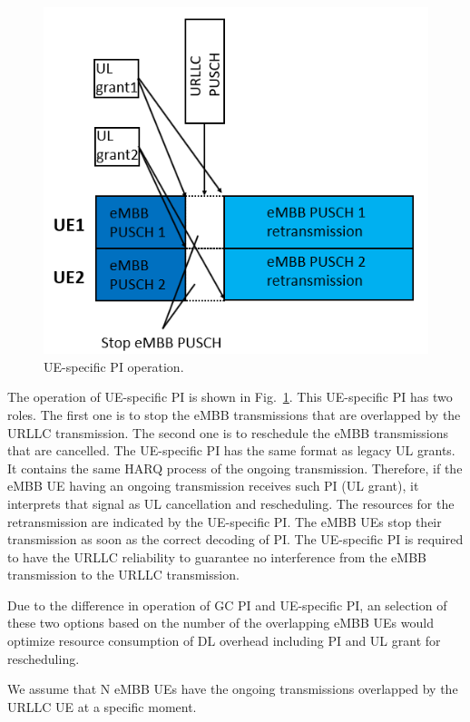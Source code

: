 \documentclass{ieeeaccess}
\begin{document}
\begin{figure}[htbp]
\centerline{\includegraphics[scale=0.4]{fig11.PNG}}
\caption{UE-specific PI operation.}
\label{fig11}
\end{figure}

The operation of UE-specific PI is shown in Fig.~\ref{fig11}. This UE-specific PI has two roles. The first one is to stop the eMBB transmissions that are overlapped by the URLLC transmission. The second one is to reschedule the eMBB transmissions that are cancelled. The UE-specific PI has the same format as legacy UL grants. It contains the same HARQ process of the ongoing transmission. Therefore, if the eMBB UE having an ongoing transmission receives such PI (UL grant), it interprets that signal as UL cancellation and rescheduling. The resources for the retransmission are indicated by the UE-specific PI. The eMBB UEs stop their transmission as soon as the correct decoding of PI. The UE-specific PI is required to have the URLLC reliability to guarantee no interference from the eMBB transmission to the URLLC transmission.

Due to the difference in operation of GC PI and UE-specific PI, an selection of these two options based on the number of the overlapping eMBB UEs would optimize resource consumption of DL overhead including PI and UL grant for rescheduling.

We assume that N eMBB UEs have the ongoing transmissions overlapped by the URLLC UE at a specific moment. 
\end{document}
